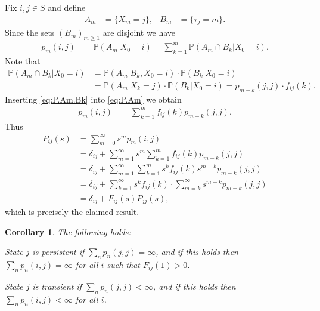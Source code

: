 \documentclass[12pt]{book}
\numberwithin{equation}{chapter}
\theoremstyle{plain}
\numberwithin{theorem}{section}
\newtheorem{corollary}[theorem]{\underline{Corollary}}
\theoremstyle{definition}
\numberwithin{exercise}{chapter}
\let\oldendproof\endproof
\renewenvironment{proof}[1][\proofname]{%
  \oldproof[\scshape\underline{#1}]%
}{\oldendproof}
\newcommand{\<}{\langle}
\renewcommand{\>}{\rangle}
\renewcommand{\(}{\left(}
\renewcommand{\)}{\right)}
\renewcommand{\[}{\left[}
\renewcommand{\]}{\right]}
\newcommand\Pb{\mathds{P}}
\newcommand\del{\delta}
\begin{document}
\begin{proof}
Fix $i,j \in S$ and define
\begin{align}
A_m
	&=	\{ X_m = j \} , &
B_m
	&=	\{ \tau_j = m \} .
\end{align}
Since the sets $(B_m)_{m \geq 1}$ are disjoint we have
\begin{align}
p_m(i,j)
	&=	\Pb( A_m | X_0 = i )
	 =	\sum_{k=1}^m \Pb( A_m \cap B_k | X_0 = i) . \label{eq:P.Am}
\end{align}
Note that
\begin{align}
\Pb( A_m \cap B_k | X_0 = i)
	&=	\Pb( A_m | B_k , X_0 = i ) \cdot \Pb(B_k | X_0 = i )  \\
	&=	\Pb( A_m | X_k = j ) \cdot \Pb( B_k | X_0 = i ) 
	=		p_{m-k}(j,j) \cdot f_{ij}(k)  . \label{eq:P.Am.Bk}
\end{align}
Inserting  \eqref{eq:P.Am.Bk} into \eqref{eq:P.Am} we obtain
\begin{align}
p_m(i,j)
	&=	\sum_{k=1}^m f_{ij}(k) p_{m-k}(j,j) .
\end{align}
Thus
\begin{align}
P_{ij}(s)
	&=	\sum_{m=0}^\infty s^m p_m(i,j) \\
	&=	\del_{ij} + \sum_{m=1}^\infty s^m \sum_{k=1}^m f_{ij}(k) p_{m-k}(j,j) \\
	&=	\del_{ij} + \sum_{m=1}^\infty \sum_{k=1}^m s^k f_{ij}(k) s^{m-k} p_{m-k}(j,j) \\
	&=	\del_{ij} + \sum_{k=1}^\infty s^k f_{ij}(k)  \cdot \sum_{m=k}^\infty  s^{m-k} p_{m-k}(j,j) \\
	&=	\del_{ij} + F_{ij}(s)P_{jj}(s) ,
\end{align}
which is precisely the claimed result.
\end{proof}

\begin{corollary}
\label{cor:trans.pers.cond}
The following holds:
\begin{enumerate*}
\item State $j$ is persistent if $\sum_n p_n(j,j) = \infty$, and if this holds then $\sum_n p_n(i,j) = \infty$ for all $i$ such that $F_{ij}(1)>0$.
\item State $j$ is transient if $\sum_n p_n(j,j) < \infty$, and if this holds then $\sum_n p_n(i,j) < \infty$ for all $i$.
\end{enumerate*}
\end{corollary}
\end{document}
